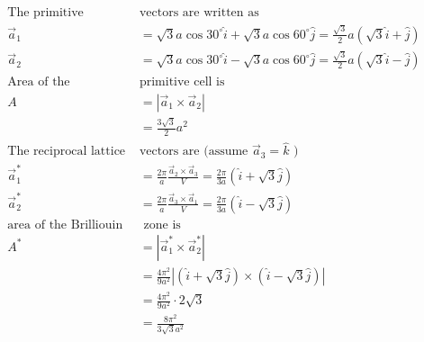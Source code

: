 \begin{answer}
	\begin{align*}
	\text{The primitive }&\text{vectors are written as}\\
	\vec{a}_{1}&=\sqrt{3} a \cos 30^{\circ} \hat{i}+\sqrt{3} a \cos 60^{\circ} \hat{j}=\frac{\sqrt{3}}{2} a(\sqrt{3} \hat{i}+\hat{j}) \\
	\vec{a}_{2}&=\sqrt{3} a \cos 30^{\circ} \hat{i}-\sqrt{3} a \cos 60^{\circ} \hat{j}=\frac{\sqrt{3}}{2} a(\sqrt{3} \hat{i}-\hat{j})\\
	\text{Area of the }&\text{primitive cell is}\\
	A&=\left|\vec{a}_{1} \times \vec{a}_{2}\right|\\&=\frac{3 \sqrt{3}}{2} a^{2}\\
	\text{The reciprocal lattice }&\text{vectors are (assume $\vec{a}_{3}=\hat{k}$ )}\\
	\vec{a}_{1}^{*}&=\frac{2 \pi}{a} \frac{\vec{a}_{2} \times \vec{a}_{3}}{V}=\frac{2 \pi}{3 a}(\hat{i}+\sqrt{3} \hat{j}) \\
	\vec{a}_{2}^{*}&=\frac{2 \pi}{a} \frac{\vec{a}_{3} \times \vec{a}_{1}}{V}=\frac{2 \pi}{3 a}(\hat{i}-\sqrt{3} \hat{j})\\
	\text{area of the Brilliouin}&\text{ zone is}\\
	A^{*}&=\left|\vec{a}_{1}^{*} \times \vec{a}_{2}^{*}\right|\\&=\frac{4 \pi^{2}}{9 a^{2}}|(\hat{i}+\sqrt{3} \hat{j}) \times(\hat{i}-\sqrt{3} \hat{j})|\\&=\frac{4 \pi^{2}}{9 a^{2}} \cdot 2 \sqrt{3}\\&=\frac{8 \pi^{2}}{3 \sqrt{3} a^{2}}
	\end{align*}
\end{answer}








